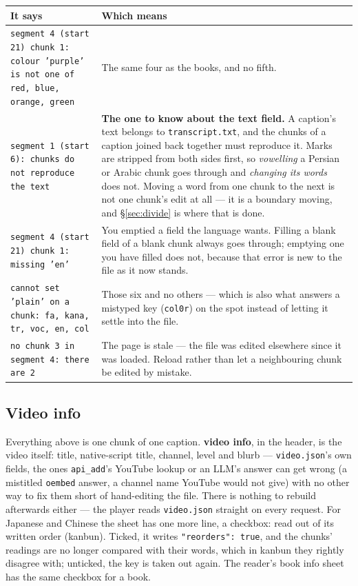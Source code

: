 \documentclass[11pt,oneside]{report}
\newcommand{\file}[1]{\texttt{#1}}
\newcommand{\menu}[1]{\textsf{#1}}
\begin{document}
\begin{center}
\begin{tabular}{@{}p{}p{}@{}}
\toprule
\textsf{It says} & \textsf{Which means} \\
\midrule
\texttt{segment 4 (start 21) chunk 1: colour 'purple' is not one of red,
blue, orange, green} & The same four as the books, and no fifth. \\
\addlinespace
\texttt{segment 1 (start 6): chunks do not reproduce the text} &
  \textbf{The one to know about the text field.} A caption's text belongs to
  \file{transcript.txt}, and the chunks of a caption joined back together must
  reproduce it. Marks are stripped from both sides first, so \emph{vowelling}
  a Persian or Arabic chunk goes through and \emph{changing its words} does
  not. Moving a word from one chunk to the next is not one chunk's edit at all
  --- it is a boundary moving, and \S\ref{sec:divide} is where that is done. \\
\addlinespace
\texttt{segment 4 (start 21) chunk 1: missing 'en'} &
  You emptied a field the language wants. Filling a blank field of a blank
  chunk always goes through; emptying one you have filled does not, because
  that error is new to the file as it now stands. \\
\addlinespace
\texttt{cannot set 'plain' on a chunk: fa, kana, tr, voc, en, col} &
  Those six and no others --- which is also what answers a mistyped key
  (\texttt{col0r}) on the spot instead of letting it settle into the file. \\
\addlinespace
\texttt{no chunk 3 in segment 4: there are 2} &
  The page is stale --- the file was edited elsewhere since it was loaded.
  Reload rather than let a neighbouring chunk be edited by mistake. \\
\bottomrule
\end{tabular}
\end{center}

\subsection*{Video info}

Everything above is one chunk of one caption. \textbf{video info}, in the
header, is the video itself: title, native-script title, channel, level and
blurb --- \file{video.json}'s own fields, the ones \texttt{api\_add}'s
YouTube lookup or an LLM's answer can get wrong (a mistitled
\texttt{oembed} answer, a channel name YouTube would not give) with no
other way to fix them short of hand-editing the file. There is nothing to
rebuild afterwards either --- the player reads \file{video.json} straight
on every request. For Japanese and Chinese the sheet has one more line, a
checkbox: \menu{read out of its written order (kanbun)}. Ticked, it writes
\texttt{"reorders": true}, and the chunks' readings are no longer compared
with their words, which in kanbun they rightly disagree with; unticked, the
key is taken out again. The reader's \menu{book info} sheet has the same
checkbox for a book.
\end{document}
